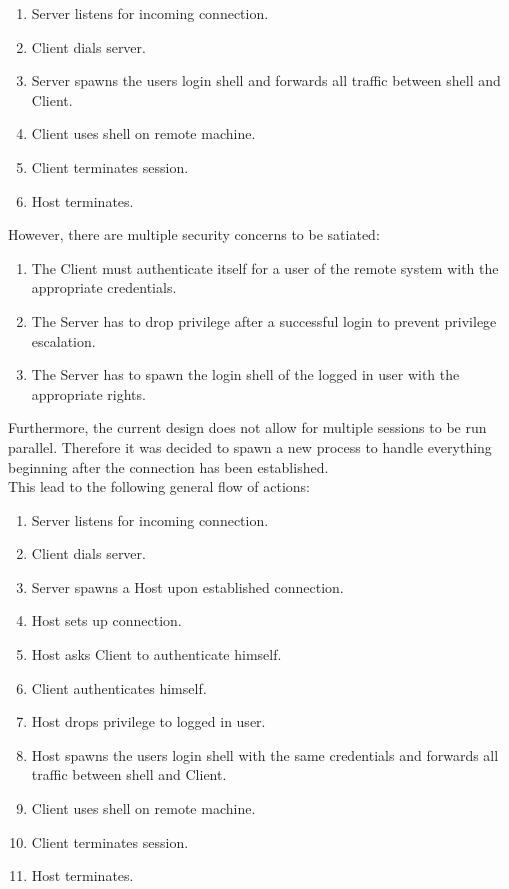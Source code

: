 \documentclass[10pt,a4paper,titlepage,twoside,english,final]{zhawreprt}
\begin{document}
\begin{enumerate}
\item Server listens for incoming connection.
\item Client dials server.
\item Server spawns the users login \gls{shell} and forwards all traffic between \gls{shell} and Client.
\item Client uses \gls{shell} on remote machine.
\item Client terminates session.
\item Host terminates.
\end{enumerate}

However, there are multiple security concerns to be satiated:

\begin{enumerate}
\item The Client must authenticate itself for a user of the remote system with the appropriate credentials.
\item The Server has to drop privilege after a successful login to prevent privilege escalation.
\item The Server has to spawn the login \gls{shell} of the logged in user with the appropriate rights.
\end{enumerate}

Furthermore, the current design does not allow for multiple sessions to be run parallel. Therefore it was decided to spawn a new process to handle everything beginning after the connection has been established.\\
This lead to  the following general flow of actions:

\begin{enumerate}
\item Server listens for incoming connection.
\item Client dials server.
\item Server spawns a Host upon established connection.
\item Host sets up connection.
\item Host asks Client to authenticate himself.
\item Client authenticates himself.
\item Host drops privilege to logged in user.
\item Host spawns the users login \gls{shell} with the same credentials and forwards all traffic between \gls{shell} and Client.
\item Client uses \gls{shell} on remote machine.
\item Client terminates session.
\item Host terminates.
\end{enumerate}
\end{document}
